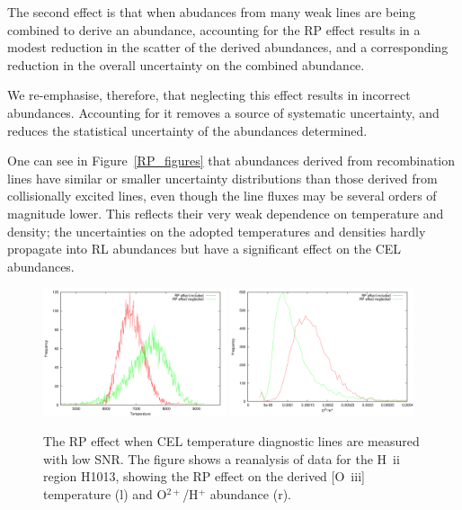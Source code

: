 \documentclass[useAMS,usenatbib]{mn2e}
\begin{document}
The second effect is that when abudances from many weak lines are being combined to derive an abundance, accounting for the RP effect results in a modest reduction in the scatter of the derived abundances, and a corresponding reduction in the overall uncertainty on the combined abundance.%

We re-emphasise, therefore, that neglecting this effect results in incorrect abundances.  Accounting for it removes a source of systematic uncertainty, and reduces the statistical uncertainty of the abundances determined.

One can see in Figure~\ref{RP_figures} that abundances derived from recombination lines have similar or smaller uncertainty distributions than those derived from collisionally excited lines, even though the line fluxes may be several orders of magnitude lower.  This reflects their very weak dependence on temperature and density; the uncertainties on the adopted temperatures and densities hardly propagate into RL abundances but have a significant effect on the CEL abundances.

\begin{figure}
\includegraphics[width=0.48\textwidth]{figures/h1013_rp_temperature.png}
\includegraphics[width=0.48\textwidth]{figures/h1013_rp_abundance.png}
\caption{The RP effect when CEL temperature diagnostic lines are measured with low SNR.  The figure shows a reanalysis of data for the H~{\sc ii} region H1013, showing the RP effect on the derived [O~{\sc iii}] temperature (l) and O$^{2+}$/H$^+$ abundance (r).}
\label{h1013_RP_effect}
\end{figure}
\end{document}
